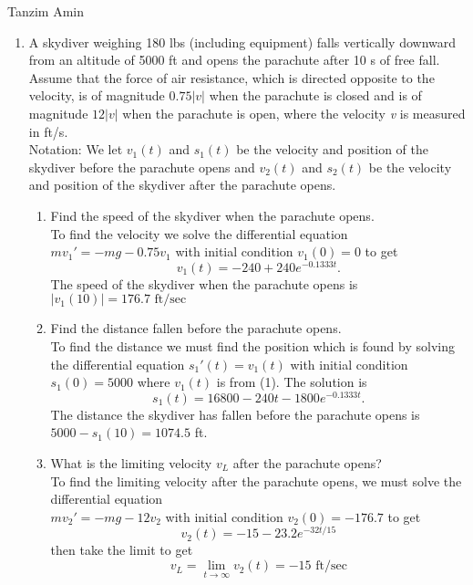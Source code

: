 \documentclass[10pt,a4paper]{article}
\begin{document}
\hfill Tanzim Amin\\
\begin{enumerate}
\item A skydiver weighing 180 lbs (including equipment) falls vertically downward from an altitude of 5000 ft
and opens the parachute after 10 s of free fall. Assume that the force of air resistance, which is directed
opposite to the velocity, is of magnitude $0.75 \vert v \vert$ when the parachute is closed and is of
magnitude $12 \vert v \vert$ when the parachute is open, where the velocity \textit{v} is measured in ft/s.\\
Notation: We let $v_1(t)$ and $s_1(t)$ be the velocity and position of the skydiver before the parachute opens
and $v_2(t)$ and $s_2(t)$ be the velocity and position of the skydiver after the parachute opens.
\begin{enumerate}
\item Find the speed of the skydiver when the parachute opens.\\
To find the velocity we solve the differential equation $mv_1'=-mg-0.75v_1$ with initial condition $v_1(0)=0$
to get
\begin{equation}
v_1(t)=-240+240e^{-0.1333t}.
\end{equation}
The speed of the skydiver when the parachute opens is $\vert v_1(10)\vert = 176.7 \text{ ft/sec} $
\item Find the distance fallen before the parachute opens.\\
To find the distance we must find the position which is found by solving the differential equation
$s_1'(t) = v_1(t)$ with initial condition $s_1(0) = 5000$ where $v_1(t)$ is from (1). The solution is
\begin{equation}
s_1(t)=16800-240t-1800e^{-0.1333t}.
\end{equation}
The distance the skydiver has fallen before the parachute opens is $5000 - s_1(10) = 1074.5$ ft.
\item What is the limiting velocity $v_L$ after the parachute opens?\\
To find the limiting velocity after the parachute opens, we must solve the differential equation\\ $mv_2'=-
mg-12v_2$ with initial condition $v_2(0)=-176.7$ to get
\begin{equation}
v_2(t)=-15-23.2e^{-32t/15}
\end{equation}
then take the limit to get
\begin{equation}
 v_L = \displaystyle{\lim_{t \to \infty} v_2(t)=-15 \text{ ft/sec}}

\end{equation}
\end{enumerate}
\end{enumerate}
\end{document}
